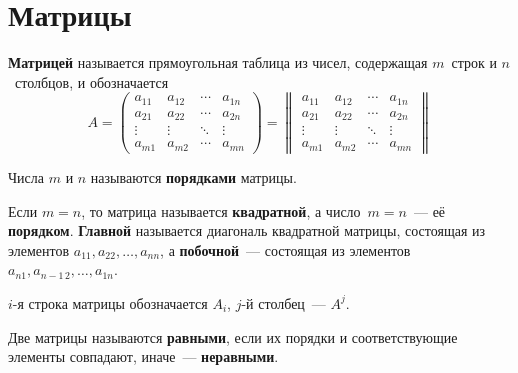 \section{Матрицы}
 \textbf{Матрицей} называется прямоугольная таблица из чисел, содержащая $m$~строк и $n$~столбцов, и обозначается
\begin{equation*}
A =
\begin{pmatrix}
a_{11} & a_{12} & \cdots & a_{1n} \\
a_{21} & a_{22} & \cdots & a_{2n} \\
\vdots & \vdots & \ddots & \vdots \\
a_{m1} & a_{m2} & \cdots & a_{mn}
\end{pmatrix} =
\begin{Vmatrix}
a_{11} & a_{12} & \cdots & a_{1n} \\
a_{21} & a_{22} & \cdots & a_{2n} \\
\vdots & \vdots & \ddots & \vdots \\
a_{m1} & a_{m2} & \cdots & a_{mn}
\end{Vmatrix}
\end{equation*}

Числа $m$ и $n$ называются \textbf{порядками} матрицы.

Если $m = n$, то матрица называется \textbf{квадратной}, а число~$m = n$~--- её \textbf{порядком}.
\textbf{Главной} называется диагональ квадратной матрицы, состоящая из элементов $a_{11}, a_{22}, \ldots, a_{nn}$, а \textbf{побочной}~--- состоящая из элементов $a_{n1}, a_{n-1\, 2}, \ldots, a_{1n}$.

$i$-я строка матрицы обозначается $A_i$, $j$-й столбец~--- $A^j$.

Две матрицы называются \textbf{равными}, если их порядки и соответствующие элементы совпадают, иначе~--- \textbf{неравными}.